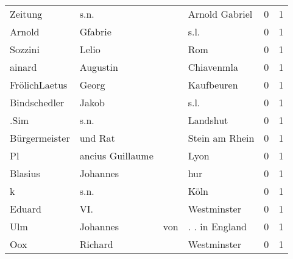 \begin{center}
\begin{tiny}
\begin{longtabu}{llllrr}
                  Zeitung &                               s.n. &             &                              Arnold Gabriel &          0 &         1 \\
                   Arnold &                            Gfabrie &             &                                        s.l. &          0 &         1 \\
                  Sozzini &                              Lelio &             &                                         Rom &          0 &         1 \\
                   ainard &                           Augustin &             &                                  Chiavenmla &          0 &         1 \\
            FrölichLaetus &                              Georg &             &                                  Kaufbeuren &          0 &         1 \\
             Bindschedler &                              Jakob &             &                                        s.l. &          0 &         1 \\
                     .Sim &                               s.n. &             &                                    Landshut &          0 &         1 \\
            Bürgermeister &                            und Rat &             &                              Stein am Rhein &          0 &         1 \\
                       Pl &                   ancius Guillaume &             &                                        Lyon &          0 &         1 \\
                  Blasius &                           Johannes &             &                                         hur &          0 &         1 \\
                        k &                               s.n. &             &                                        Köln &          0 &         1 \\
                   Eduard &                                VI. &             &                                 Westminster &          0 &         1 \\
                      Ulm &                           Johannes &         von &                              . . in England &          0 &         1 \\
                      Oox &                            Richard &             &                                 Westminster &          0 &         1 \\

\end{longtabu}
\end{tiny}
\end{center}
